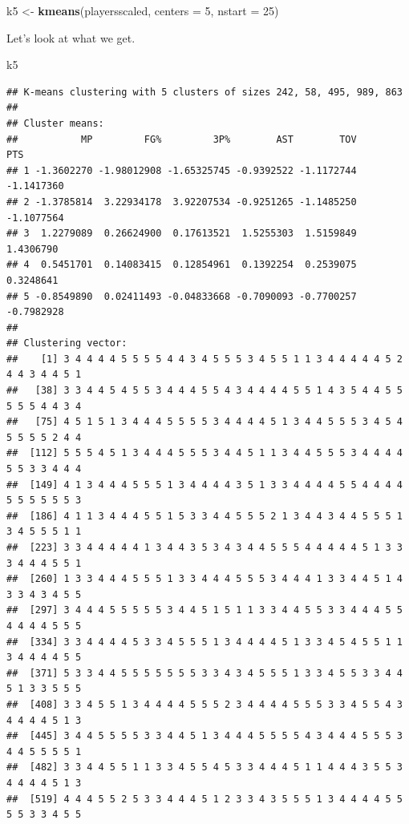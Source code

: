 \documentclass[
]{book}
\newenvironment{Shaded}{\begin{snugshade}}{\end{snugshade}}
\newcommand{\DataTypeTok}[1]{\textcolor[rgb]{0.13,0.29,0.53}{#1}}
\newcommand{\DecValTok}[1]{\textcolor[rgb]{0.00,0.00,0.81}{#1}}
\newcommand{\KeywordTok}[1]{\textcolor[rgb]{0.13,0.29,0.53}{\textbf{#1}}}
\newcommand{\NormalTok}[1]{#1}
\newcommand{\StringTok}[1]{\textcolor[rgb]{0.31,0.60,0.02}{#1}}
\begin{document}
\begin{Shaded}
\begin{Highlighting}[]
\NormalTok{k5 <-}\StringTok{ }\KeywordTok{kmeans}\NormalTok{(playersscaled, }\DataTypeTok{centers =} \DecValTok{5}\NormalTok{, }\DataTypeTok{nstart =} \DecValTok{25}\NormalTok{)}
\end{Highlighting}
\end{Shaded}

Let's look at what we get.

\begin{Shaded}
\begin{Highlighting}[]
\NormalTok{k5}
\end{Highlighting}
\end{Shaded}

\begin{verbatim}
## K-means clustering with 5 clusters of sizes 242, 58, 495, 989, 863
## 
## Cluster means:
##           MP         FG%         3P%        AST        TOV        PTS
## 1 -1.3602270 -1.98012908 -1.65325745 -0.9392522 -1.1172744 -1.1417360
## 2 -1.3785814  3.22934178  3.92207534 -0.9251265 -1.1485250 -1.1077564
## 3  1.2279089  0.26624900  0.17613521  1.5255303  1.5159849  1.4306790
## 4  0.5451701  0.14083415  0.12854961  0.1392254  0.2539075  0.3248641
## 5 -0.8549890  0.02411493 -0.04833668 -0.7090093 -0.7700257 -0.7982928
## 
## Clustering vector:
##    [1] 3 4 4 4 4 5 5 5 5 4 4 3 4 5 5 5 3 4 5 5 1 1 3 4 4 4 4 4 5 2 4 4 3 4 4 5 1
##   [38] 3 3 4 4 5 4 5 5 3 4 4 4 5 5 4 3 4 4 4 4 5 5 1 4 3 5 4 4 5 5 5 5 5 4 4 3 4
##   [75] 4 5 1 5 1 3 4 4 4 5 5 5 5 3 4 4 4 4 5 1 3 4 4 5 5 5 3 4 5 4 5 5 5 5 2 4 4
##  [112] 5 5 5 4 5 1 3 4 4 4 5 5 5 3 4 4 5 1 1 3 4 4 5 5 5 3 4 4 4 4 5 5 3 3 4 4 4
##  [149] 4 1 3 4 4 4 5 5 5 1 3 4 4 4 4 3 5 1 3 3 4 4 4 4 5 5 4 4 4 4 5 5 5 5 5 5 3
##  [186] 4 1 1 3 4 4 4 5 5 1 5 3 3 4 4 5 5 5 2 1 3 4 4 3 4 4 5 5 5 1 3 4 5 5 5 1 1
##  [223] 3 3 4 4 4 4 4 1 3 4 4 3 5 3 4 3 4 4 5 5 5 4 4 4 4 4 5 1 3 3 3 4 4 4 5 5 1
##  [260] 1 3 3 4 4 4 5 5 5 1 3 3 4 4 4 5 5 5 3 4 4 4 1 3 3 4 4 5 1 4 3 3 4 3 4 5 5
##  [297] 3 4 4 4 5 5 5 5 5 3 4 4 5 1 5 1 1 3 3 4 4 5 5 3 3 4 4 4 5 5 4 4 4 4 5 5 5
##  [334] 3 3 4 4 4 4 5 3 3 4 5 5 5 1 3 4 4 4 4 5 1 3 3 4 5 4 5 5 1 1 3 4 4 4 4 5 5
##  [371] 5 3 3 4 4 5 5 5 5 5 5 5 3 3 4 3 4 5 5 5 1 3 3 4 5 5 3 3 4 4 5 1 3 3 5 5 5
##  [408] 3 3 4 5 5 1 3 4 4 4 4 5 5 5 2 3 4 4 4 4 5 5 5 3 3 4 5 5 4 3 4 4 4 4 5 1 3
##  [445] 3 4 4 5 5 5 5 3 3 4 4 5 1 3 4 4 4 5 5 5 5 4 3 4 4 4 5 5 5 3 4 4 5 5 5 5 1
##  [482] 3 3 4 4 5 5 1 1 3 3 4 5 5 4 5 3 3 4 4 4 5 1 1 4 4 4 3 5 5 3 4 4 4 4 5 1 3
##  [519] 4 4 4 5 5 2 5 3 3 4 4 4 5 1 2 3 3 4 3 5 5 5 1 3 4 4 4 4 5 5 5 5 3 3 4 5 5

\end{verbatim}
\end{document}
